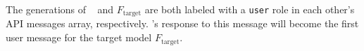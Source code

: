 The generations of \methodname~ and $F_\text{target}$ are both labeled with a \texttt{user} role in each other's API messages array, respectively. \methodname's response to this message will become the first user message for the target model $F_\text{target}$.








